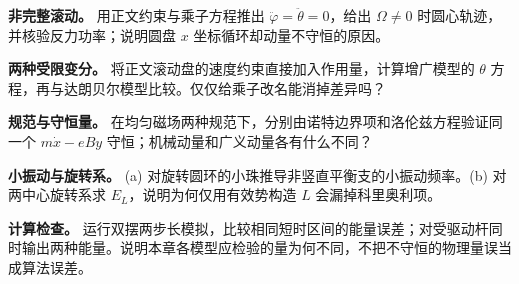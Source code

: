 \begin{bookexercises}
\item {} \textbf{非完整滚动。} 用正文约束与乘子方程推出 $\ddot\varphi=\ddot\theta=0$，给出 $\Omega\ne0$ 时圆心轨迹，并核验反力功率；说明圆盘 $x$ 坐标循环却动量不守恒的原因。
\item {} \textbf{两种受限变分。} 将正文滚动盘的速度约束直接加入作用量，计算增广模型的 $\theta$ 方程，再与达朗贝尔模型比较。仅仅给乘子改名能消掉差异吗？
\item {} \textbf{规范与守恒量。} 在均匀磁场两种规范下，分别由诺特边界项和洛伦兹方程验证同一个 $m\dot x-eBy$ 守恒；机械动量和广义动量各有什么不同？
\item {} \textbf{小振动与旋转系。} (a) 对旋转圆环的小珠推导非竖直平衡支的小振动频率。(b) 对两中心旋转系求 $E_L$，说明为何仅用有效势构造 $L$ 会漏掉科里奥利项。
\item {} \textbf{计算检查。} 运行双摆两步长模拟，比较相同短时区间的能量误差；对受驱动杆同时输出两种能量。说明本章各模型应检验的量为何不同，不把不守恒的物理量误当成算法误差。
\end{bookexercises}

